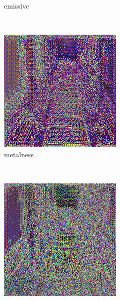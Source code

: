 \begin{figure}[h!]
\begin{subfigure}[b]{0.175\textwidth}
     \caption{emissive}
    \end{subfigure}
    ~
    \begin{subfigure}[b]{0.175\textwidth}
     \includegraphics[width=\textwidth]{figures/result/single/metalness/2.png}
     \caption{metalness}
    \end{subfigure}
    \\ \vspace{0.2cm}
    \begin{subfigure}[b]{0.175\textwidth}
     \includegraphics[width=\textwidth]{figures/result/single/normal/2.png}

\end{subfigure}
\end{figure}
